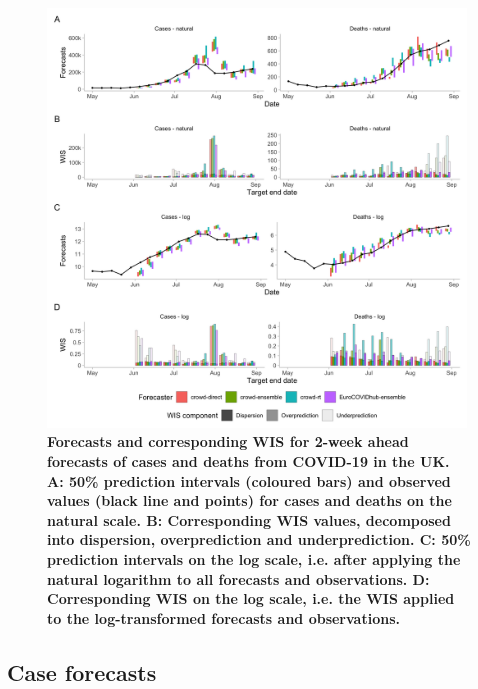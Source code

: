 \documentclass[10pt,a4paper,twocolumn]{article}
\begin{document}
\begin{figure}
\centering
\includegraphics[width=0.99\textwidth]{../output/figures/scores-and-forecasts.png}
\caption{\bf{Forecasts and corresponding WIS for 2-week ahead forecasts of cases and deaths from COVID-19 in the UK.} A: 50\% prediction intervals (coloured bars) and observed values (black line and points) for cases and deaths on the natural scale. B: Corresponding WIS values, decomposed into dispersion, overprediction and underprediction. C: 50\% prediction intervals on the log scale, i.e. after applying the natural logarithm to all forecasts and observations. D: Corresponding WIS on the log scale, i.e. the WIS applied to the log-transformed forecasts and observations.} 
\label{fig:forecasts-scores} 
\end{figure}

\subsection*{Case forecasts}
\end{document}
